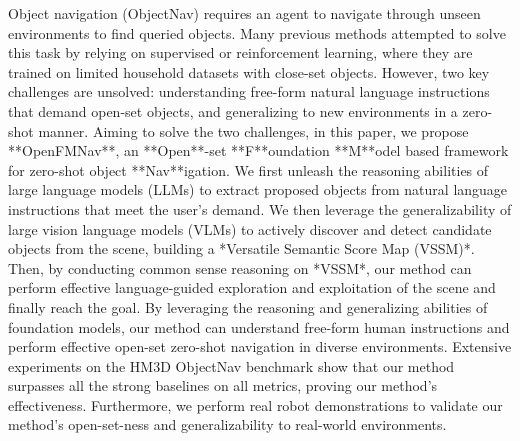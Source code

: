 Object navigation (ObjectNav) requires an agent to navigate through unseen environments to find queried objects. Many previous methods attempted to solve this task by relying on supervised or reinforcement learning, where they are trained on limited household datasets with close-set objects. However, two key challenges are unsolved: understanding free-form natural language instructions that demand open-set objects, and generalizing to new environments in a zero-shot manner. Aiming to solve the two challenges, in this paper, we propose **OpenFMNav**, an **Open**-set **F**oundation **M**odel based framework for zero-shot object **Nav**igation. We first unleash the reasoning abilities of large language models (LLMs) to extract proposed objects from natural language instructions that meet the user's demand. We then leverage the generalizability of large vision language models (VLMs) to actively discover and detect candidate objects from the scene, building a *Versatile Semantic Score Map (VSSM)*. Then, by conducting common sense reasoning on *VSSM*, our method can perform effective language-guided exploration and exploitation of the scene and finally reach the goal. By leveraging the reasoning and generalizing abilities of foundation models, our method can understand free-form human instructions and perform effective open-set zero-shot navigation in diverse environments. Extensive experiments on the HM3D ObjectNav benchmark show that our method surpasses all the strong baselines on all metrics, proving our method's effectiveness. Furthermore, we perform real robot demonstrations to validate our method's open-set-ness and generalizability to real-world environments.